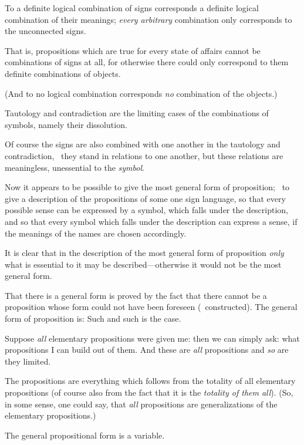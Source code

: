 {To a definite logical combination of signs
corresponds a definite logical combination of their
meanings; \emph{every arbitrary} combination only corresponds
to the unconnected signs.

That is, propositions which are true for every
state of affairs cannot be combinations of signs at
all, for otherwise there could only correspond to
them definite combinations of objects.

(And to no logical combination corresponds \emph{no}
combination of the objects.)

Tautology and contradiction are the limiting
cases of the combinations of symbols, namely their
dissolution.}


{Of course the signs are also combined with one
another in the tautology and contradiction, \idEst\ they
stand in relations to one another, but these
relations are meaningless, unessential to the
\emph{symbol}.}


{Now it appears to be possible to give the
most general form of proposition; \idEst\ to give a
description of the propositions of some one sign
language, so that every possible sense can be
expressed by a symbol, which falls under the
description, and so that every symbol which falls
under the description can express a sense, if
the meanings of the names are chosen accordingly.

It is clear that in the description of the most
general form of proposition \emph{only} what is essential
to it may be described---otherwise it would not be
the most general form.

That there is a general form is proved by the
fact that there cannot be a proposition whose
form could not have been foreseen (\idEst\ constructed).
The general form of proposition is: Such and
such is the case.}


{Suppose \emph{all} elementary propositions were given
me: then we can simply ask: what propositions I
can build out of them. And these are \emph{all} propositions
and \emph{so} are they limited.}


{The propositions are everything which follows
from the totality of all elementary propositions (of
course also from the fact that it is the \emph{totality of
them all}). (So, in some sense, one could say, that
\emph{all} propositions are generalizations of the elementary
propositions.)}


{The general propositional form is a variable.}



